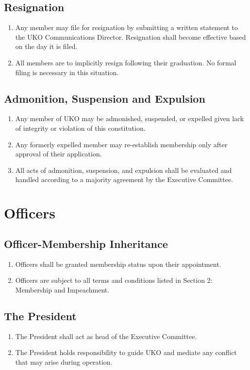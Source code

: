 \documentclass[12pt,executivepaper]{article}
\begin{document}
\subsection{Resignation}
\begin{enumerate}
    \item Any member may file for resignation by submitting a written statement to
          the UKO Communications Director. Resignation shall become effective based
          on the day it is filed.
    \item All members are to implicitly resign following their graduation. No
          formal filing is necessary in this situation.
\end{enumerate}

\subsection{Admonition, Suspension and Expulsion}
\begin{enumerate}
    \item Any member of UKO may be admonished, suspended, or expelled given lack of
          integrity or violation of this constitution.
    \item Any formerly expelled member may re-establish membership only after
          approval of their application.
    \item All acts of admonition, suspension, and expulsion shall be evaluated
          and handled according to a majority agreement by the Executive
          Committee.
\end{enumerate}

\section{Officers}

\subsection{Officer-Membership Inheritance}
\begin{enumerate}
    \item Officers shall be granted membership status upon their appointment.
    \item Officers are subject to all terms and conditions listed in Section 2:
          Membership and Impeachment.
\end{enumerate}

\subsection{The President}
\begin{enumerate}
    \item The President shall act as head of the Executive Committee.
    \item The President holds responsibility to guide UKO and mediate any conflict
          that may arise during operation.
\end{enumerate}
\end{document}
